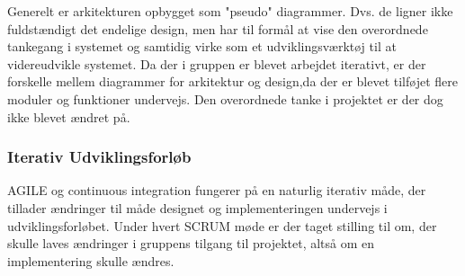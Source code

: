 Generelt er arkitekturen opbygget som "pseudo" diagrammer. Dvs. de ligner ikke fuldstændigt det endelige design, men har til formål at vise den overordnede tankegang i systemet og samtidig virke som et udviklingsværktøj til at videreudvikle systemet. Da der i gruppen er blevet arbejdet iterativt, er der forskelle mellem diagrammer for arkitektur og design,da der er blevet tilføjet flere moduler og funktioner undervejs. Den overordnede tanke i projektet er der dog ikke blevet ændret på.

\subsubsection{Iterativ Udviklingsforløb}

AGILE og continuous integration fungerer på en naturlig iterativ måde, der tillader 
ændringer til måde designet og implementeringen undervejs i udviklingsforløbet.
Under hvert SCRUM møde er der taget stilling til om, der skulle laves ændringer i 
gruppens tilgang til projektet, altså om en implementering skulle ændres. \\



